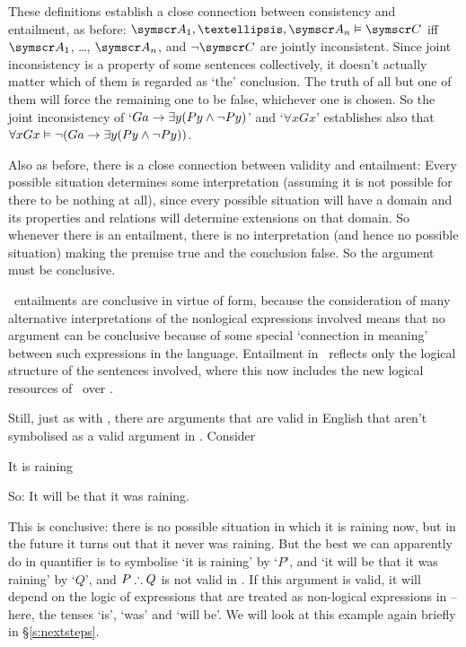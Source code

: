 These definitions establish a close connection between consistency and entailment, as before: $\meta{A}_{1},…,\meta{A}_{n} \entails \meta{C}$ iff $\meta{A}_{1}$, …, $\meta{A}_{n}$, and $\enot\meta{C}$ are jointly inconsistent. Since joint inconsistency is a property of some sentences collectively, it doesn't actually matter which of them is regarded as `the' conclusion. The truth of all but one of them will force the remaining one to be false, whichever one is chosen. So the joint inconsistency of `$Ga \rightarrow \exists y (Py \wedge \neg Py)$' and `$\forall x Gx$' establishes also that $\forall x Gx \vDash \neg (Ga \rightarrow \exists y (Py \wedge \neg Py))$. 


Also as before, there is a close connection between validity and entailment:  
Every possible situation determines some interpretation (assuming it is not possible for there to be nothing at all), since every possible situation will have a domain and its properties and relations will determine extensions on that domain. So whenever there is an entailment, there is no interpretation (and hence no possible situation) making the premise true and the conclusion false. So the argument must be conclusive.

\FOL\ entailments are conclusive in virtue of form, because the consideration of many alternative interpretations of the nonlogical expressions involved means that no argument can be conclusive because of some special `connection in meaning' between such expressions in the language. Entailment in \FOL\ reflects only the logical structure of the sentences involved, where this now includes the new logical resources of \FOL\ over \TFL.

Still, just as with \TFL, there are arguments that are valid in English that aren't symbolised as a valid argument in \FOL. Consider \begin{earg}
\item[] It is raining
\item[So:] It will be that it was raining.
\end{earg} This is conclusive: there is no possible situation in which it is raining now, but in the future it turns out that it never was raining. But the best we can apparently do in quantifier is to symbolise `it is raining' by `$P$', and `it will be that it was raining' by `$Q$', and $P \mathrel{\therefore} Q$ is not valid in \FOL. If this argument is valid, it will depend on the logic of expressions that are treated as non-logical expressions in \FOL – here, the tenses `is', `was' and `will be'. We will look at this example again briefly in §\ref{s:nextsteps}.

